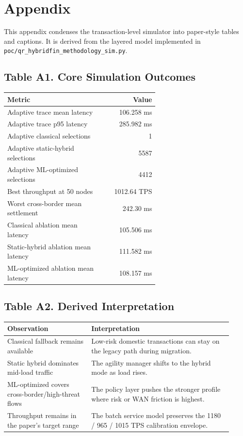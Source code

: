 \section*{Appendix}
This appendix condenses the transaction-level simulator into paper-style tables and captions.
It is derived from the layered model implemented in \texttt{poc/qr\_hybridfin\_methodology\_sim.py}.
\subsection*{Table A1. Core Simulation Outcomes}
\begin{table}[h]
\centering
\begin{tabular}{@{}p{0.62\linewidth}r@{}}
\toprule
Metric & Value \\
\midrule
Adaptive trace mean latency & 106.258 ms \\
Adaptive trace p95 latency & 285.982 ms \\
Adaptive classical selections & 1 \\
Adaptive static-hybrid selections & 5587 \\
Adaptive ML-optimized selections & 4412 \\
Best throughput at 50 nodes & 1012.64 TPS \\
Worst cross-border mean settlement & 242.30 ms \\
Classical ablation mean latency & 105.506 ms \\
Static-hybrid ablation mean latency & 111.582 ms \\
ML-optimized ablation mean latency & 108.157 ms \\
\bottomrule
\end{tabular}
\end{table}
\subsection*{Table A2. Derived Interpretation}
\begin{table}[h]
\centering
\begin{tabular}{@{}p{0.34\linewidth}p{0.58\linewidth}@{}}
\toprule
Observation & Interpretation \\
\midrule
Classical fallback remains available & Low-risk domestic transactions can stay on the legacy path during migration. \\
Static hybrid dominates mid-load traffic & The agility manager shifts to the hybrid mode as load rises. \\
ML-optimized covers cross-border/high-threat flows & The policy layer pushes the stronger profile where risk or WAN friction is highest. \\
Throughput remains in the paper's target range & The batch service model preserves the 1180 / 965 / 1015 TPS calibration envelope. \\
\bottomrule
\end{tabular}
\end{table}

